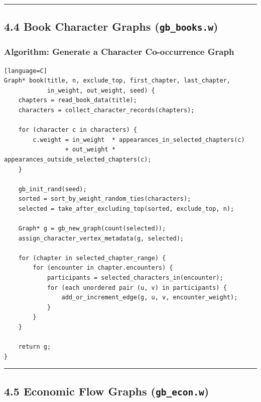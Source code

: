 \documentclass[11pt]{article}
\begin{document}
\begin{center}\rule{0.5\linewidth}{0.5pt}\end{center}

\subsection{\texorpdfstring{4.4 Book Character Graphs (\texttt{gb\_books.w})}{4.4 Book Character Graphs (gb\_books.w)}}\label{book-character-graphs-gb_books.w}

\subsubsection{Algorithm: Generate a Character Co-occurrence Graph}\label{algorithm-generate-a-character-co-occurrence-graph}

\begin{verbatim}[language=C]
Graph* book(title, n, exclude_top, first_chapter, last_chapter,
            in_weight, out_weight, seed) {
    chapters = read_book_data(title);
    characters = collect_character_records(chapters);

    for (character c in characters) {
        c.weight = in_weight  * appearances_in_selected_chapters(c)
                 + out_weight * appearances_outside_selected_chapters(c);
    }

    gb_init_rand(seed);
    sorted = sort_by_weight_random_ties(characters);
    selected = take_after_excluding_top(sorted, exclude_top, n);

    Graph* g = gb_new_graph(count(selected));
    assign_character_vertex_metadata(g, selected);

    for (chapter in selected_chapter_range) {
        for (encounter in chapter.encounters) {
            participants = selected_characters_in(encounter);
            for (each unordered pair (u, v) in participants) {
                add_or_increment_edge(g, u, v, encounter_weight);
            }
        }
    }

    return g;
}
\end{verbatim}

\begin{center}\rule{0.5\linewidth}{0.5pt}\end{center}

\subsection{\texorpdfstring{4.5 Economic Flow Graphs (\texttt{gb\_econ.w})}{4.5 Economic Flow Graphs (gb\_econ.w)}}\label{economic-flow-graphs-gb_econ.w}
\end{document}
